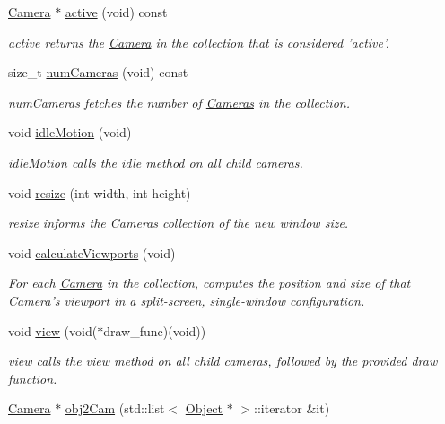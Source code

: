 \begin{DoxyCompactItemize}
\hyperlink{class_camera}{Camera} $\ast$ \hyperlink{class_cameras_a6002cbceb6a93092a1a029af486349a0}{active} (void) const 
\begin{DoxyCompactList}\small\item\em active returns the \hyperlink{class_camera}{Camera} in the collection that is considered 'active'. \end{DoxyCompactList}\item 
size\-\_\-t \hyperlink{class_cameras_acf7e92b5163efeeb88543e605d436a0e}{num\-Cameras} (void) const 
\begin{DoxyCompactList}\small\item\em num\-Cameras fetches the number of \hyperlink{class_cameras}{Cameras} in the collection. \end{DoxyCompactList}\item 
void \hyperlink{class_cameras_ac4fee80c5cd473ee4fa2360a95857da7}{idle\-Motion} (void)
\begin{DoxyCompactList}\small\item\em idle\-Motion calls the idle method on all child cameras. \end{DoxyCompactList}\item 
void \hyperlink{class_cameras_a0d0b08d599d471c0070665006f3bc437}{resize} (int width, int height)
\begin{DoxyCompactList}\small\item\em resize informs the \hyperlink{class_cameras}{Cameras} collection of the new window size. \end{DoxyCompactList}\item 
void \hyperlink{class_cameras_a9d3b24eec1504127e4942aa0e9412ae7}{calculate\-Viewports} (void)
\begin{DoxyCompactList}\small\item\em For each \hyperlink{class_camera}{Camera} in the collection, computes the position and size of that \hyperlink{class_camera}{Camera}'s viewport in a split-\/screen, single-\/window configuration. \end{DoxyCompactList}\item 
void \hyperlink{class_cameras_adeb29c1d639fcfbae4c68017bc8ef4d4}{view} (void($\ast$draw\-\_\-func)(void))
\begin{DoxyCompactList}\small\item\em view calls the view method on all child cameras, followed by the provided draw function. \end{DoxyCompactList}\item 
\hyperlink{class_camera}{Camera} $\ast$ \hyperlink{class_cameras_a8a6c7958396c6b0d07380aa762b15fcc}{obj2\-Cam} (std\-::list$<$ \hyperlink{class_object}{Object} $\ast$ $>$\-::iterator \&it)

\end{DoxyCompactItemize}
